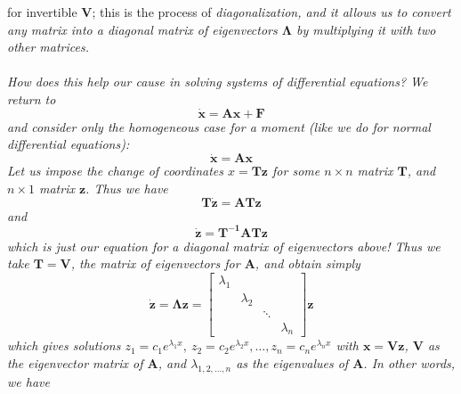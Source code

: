\documentclass{article}
\begin{document}
for invertible $\mathbf{V}$; this is the process of \it diagonalization, \normalfont and it allows us to convert any matrix into a diagonal matrix of eigenvectors $\mathbf{\Lambda}$ by multiplying it with two other matrices.\\ \\
How does this help our cause in solving systems of differential equations? We return to 
\begin{equation*}
    \dot{\mathbf{x}} = \mathbf{A}\mathbf{x} + \mathbf{F}
\end{equation*}
and consider only the homogeneous case for a moment (like we do for normal differential equations):
\begin{equation*}
    \dot{\mathbf{x}} = \mathbf{A}\mathbf{x}
\end{equation*}
Let us impose the change of coordinates $x = \mathbf{Tz}$ for some $n \times n$ matrix $\mathbf{T}$, and $n\times 1$ matrix $\mathbf{z}$. Thus we have 
\begin{equation*}
    \mathbf{T\dot{z}} = \mathbf{A}\mathbf{Tz}
\end{equation*}
and 
\begin{equation*}
    \mathbf{\dot{z}} = \mathbf{T^{-1}}\mathbf{A}\mathbf{Tz}
\end{equation*}
which is just our equation for a diagonal matrix of eigenvectors above! Thus we take $\mathbf{T} = \mathbf{V}$, the matrix of eigenvectors for $\mathbf{A}$, and obtain simply 
\begin{equation*}
    \mathbf{\dot{z}} = \mathbf{\Lambda} \mathbf{z} = \begin{bmatrix}
        \lambda_1 & & & \\
        & \lambda_2 & & \\
        & & \ddots & \\
        & & & \lambda_n
    \end{bmatrix}\mathbf{z}
\end{equation*}
which gives solutions $z_1 = c_1e^{\lambda_1 x},\ z_2 = c_2e^{\lambda_2 x}, \dots, z_n = c_ne^{\lambda_n x}$ with $\mathbf{x=Vz}$, $\mathbf{V}$ as the eigenvector matrix of $\mathbf{A}$, and $\lambda_{1,2,\dots,n}$ as the eigenvalues of $\mathbf{A}$. In other words, we have
\end{document}
